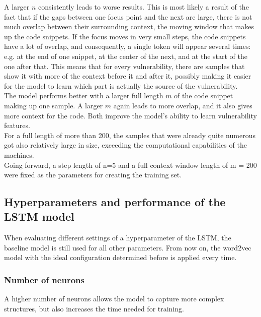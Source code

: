 \documentclass[
a4paper,
pagesize,
pdftex,
12pt,
twoside, %
BCOR=5mm, %
ngerman,
fleqn,
final,
]{scrartcl}
\begin{document}
	A larger $n$ consistently leads to worse results. This is most likely a result of the fact that if the gaps between one focus point and the next are large, there is not much overlap between their surrounding context, the moving window that makes up the code snippets. If the focus moves in very small steps, the code snippets have a lot of overlap, and consequently, a single token will appear several times: e.g. at the end of one snippet, at the center of the next, and at the start of the one after that. This means that for every vulnerability, there are samples that show it with more of the context before it and after it, possibly making it easier for the model to learn which part is actually the source of the vulnerability.\\
	The model performs better with a larger full length $m$ of the code snippet making up one sample. A larger $m$ again leads to more overlap, and it also gives more context for the code. Both improve the model's ability to learn vulnerability features. \\
	For a full length of more than 200, the samples that were already quite numerous got also relatively large in size, exceeding the computational capabilities of the machines. \\
	Going forward, a step length of n=5 and a full context window length of m = 200 were fixed as the parameters for creating the training set.
	
	\subsection{Hyperparameters and performance of the LSTM model}
	
	When evaluating different settings of a hyperparameter of the LSTM, the baseline model is still used for all other parameters. From now on, the word2vec model with the ideal configuration determined before is applied every time.
	
	\subsubsection{Number of neurons}
	A higher number of neurons allows the model to capture more complex structures, but also increases the time needed for training.
	
\end{document}
